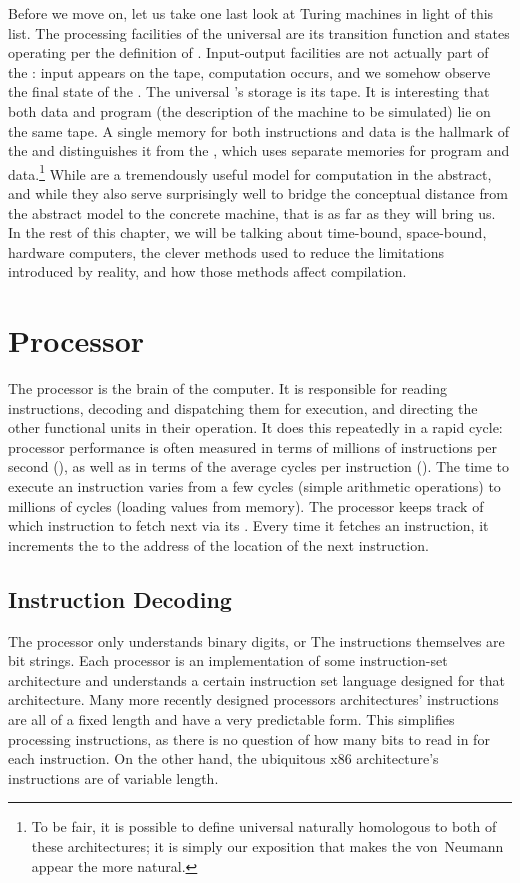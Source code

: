 Before we move on, let us take one last look at Turing machines in light of this list. The processing facilities of the universal \TM are its transition function and states operating per the definition of \TMs. Input-output facilities are not actually part of the \TM: input appears on the tape, computation occurs, and we somehow observe the final state of the \TM. The universal \TM's storage is its tape. It is interesting that both data and program (the description of the machine to be simulated) lie on the same tape. A single memory for both instructions and data is the hallmark of the  and distinguishes it from the , which uses separate memories for program and data.\footnote{To be fair, it is possible to define universal \TMs naturally homologous to both of these architectures; it is simply our exposition that makes the von~Neumann appear the more natural.} While \TMs are a tremendously useful model for computation in the abstract, and while they also serve surprisingly well to bridge the conceptual distance from the abstract model to the concrete machine, that is as far as they will bring us. In the rest of this chapter, we will be talking about time-bound, space-bound, hardware computers, the clever methods used to reduce the limitations introduced by reality, and how those methods affect compilation.

\section{Processor}\label{background:computers:processor}
The processor is the brain of the computer. It is responsible for reading instructions, decoding and dispatching them for execution, and directing the other functional units in their operation. It does this repeatedly in a rapid cycle: processor performance is often measured in terms of millions of instructions per second (), as well as in terms of the average cycles per instruction (). The time to execute an instruction varies from a few cycles (simple arithmetic operations) to millions of cycles (loading values from memory). The processor keeps track of which instruction to fetch next via its . Every time it fetches an instruction, it increments the  to the address of the location of the next instruction.

\subsection{Instruction Decoding}
The processor only understands binary digits, or  The instructions themselves are bit strings. Each processor is an implementation of some instruction-set architecture and understands a certain instruction set language designed for that architecture. Many more recently designed processors architectures' instructions are all of a fixed length and have a very predictable form. This simplifies processing instructions, as there is no question of how many bits to read in for each instruction. On the other hand, the ubiquitous x86 architecture's instructions are of variable length.

